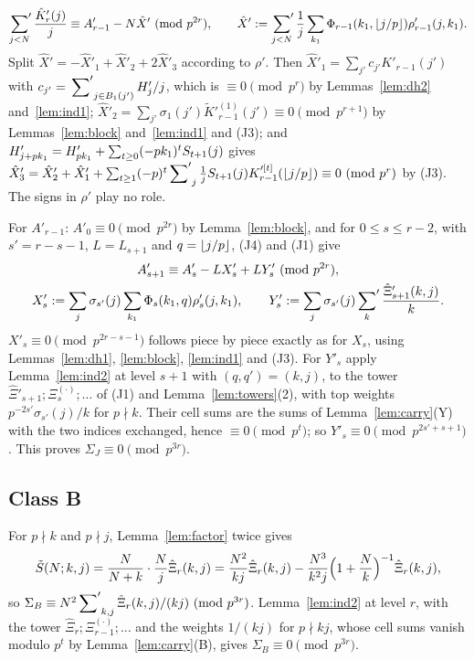 \documentclass[11pt]{amsart}
\begin{document}
\[ \sideset{}{'}\sum_{j<N}\frac{\hat K'_r(j)}j\equiv A'_{r-1}-N\hat X'\ (\mathrm{mod}\ p^{2r}),\qquad\hat X':=\sideset{}{'}\sum_{j<N}\frac1j\sum_{k_1}\Phi_{r-1}(k_1,\left\lfloor j/p\right\rfloor)\rho'_{r-1}(j,k_1). \]
Split $\hat X'=-\hat X'_1+\hat X'_2+2\hat X'_3$ according to $\rho'$. Then $\hat X'_1=\sum_{j'}c_{j'}K'_{r-1}(j')$ with $c_{j'}=\sideset{}{'}\sum_{j\in B_1(j')}H'_j/j$, which is $\equiv0\pmod{p^r}$ by Lemmas~\ref{lem:dh2} and~\ref{lem:ind1}; $\hat X'_2=\sum_{j'}\sigma_1(j')\tilde K'^{(1)}_{r-1}(j')\equiv0\pmod{p^{r+1}}$ by Lemmas~\ref{lem:block} and~\ref{lem:ind1} and (J3); and $H'_{j+pk_1}=H'_{pk_1}+\sum_{t\ge0}(-pk_1)^tS_{t+1}(j)$ gives $\hat X'_3=\hat X'_2+\hat X'_1+\sum_{t\ge1}(-p)^t\sideset{}{'}\sum_j\frac1jS_{t+1}(j)K'^{[t]}_{r-1}(\left\lfloor j/p\right\rfloor)\equiv0\ (\mathrm{mod}\ p^r)$ by (J3). The signs in $\rho'$ play no role.

For $A'_{r-1}$: $A'_0\equiv0\pmod{p^{2r}}$ by Lemma~\ref{lem:block}, and for $0\le s\le r-2$, with $s'=r-s-1$, $L=L_{s+1}$ and $q=\left\lfloor j/p\right\rfloor$, (J4) and (J1) give
\begin{gather*} A'_{s+1}\equiv A'_s-LX'_s+LY'_s\ (\mathrm{mod}\ p^{2r}),\\ X'_s:=\sum_j\sigma_{s'}(j)\sum_{k_1}\Phi_s(k_1,q)\rho'_s(j,k_1),\qquad Y'_s:=\sum_j\sigma_{s'}(j)\sideset{}{'}\sum_k\frac{\hat\Xi'_{s+1}(k,j)}k. \end{gather*}
$X'_s\equiv0\pmod{p^{2r-s-1}}$ follows piece by piece exactly as for $X_s$, using Lemmas~\ref{lem:dh1}, \ref{lem:block}, \ref{lem:ind1} and (J3). For $Y'_s$ apply Lemma~\ref{lem:ind2} at level $s+1$ with $(q,q')=(k,j)$, to the tower $\hat\Xi'_{s+1};\Xi^{(\cdot)}_s;\dots$ of (J1) and Lemma~\ref{lem:towers}(2), with top weights $p^{-2s'}\sigma_{s'}(j)/k$ for $p\nmid k$. Their cell sums are the sums of Lemma~\ref{lem:carry}(Y) with the two indices exchanged, hence $\equiv0\pmod{p^t}$; so $Y'_s\equiv0\pmod{p^{2s'+s+1}}$. This proves $\Sigma_J\equiv0\pmod{p^{3r}}$.

\subsection{Class B}
For $p\nmid k$ and $p\nmid j$, Lemma~\ref{lem:factor} twice gives
\[ \tilde S(N;k,j)=\frac N{N+k}\cdot\frac Nj\hat\Xi_r(k,j)=\frac{N^2}{kj}\hat\Xi_r(k,j)-\frac{N^3}{k^2j}\Bigl(1+\frac Nk\Bigr)^{-1}\hat\Xi_r(k,j), \]
so $\Sigma_B\equiv N^2\sideset{}{'}\sum_{k,j}\hat\Xi_r(k,j)/(kj)\ (\mathrm{mod}\ p^{3r})$. Lemma~\ref{lem:ind2} at level $r$, with the tower $\hat\Xi_r;\Xi^{(\cdot)}_{r-1};\dots$ and the weights $1/(kj)$ for $p\nmid kj$, whose cell sums vanish modulo $p^t$ by Lemma~\ref{lem:carry}(B), gives $\Sigma_B\equiv0\pmod{p^{3r}}$.
\end{document}
